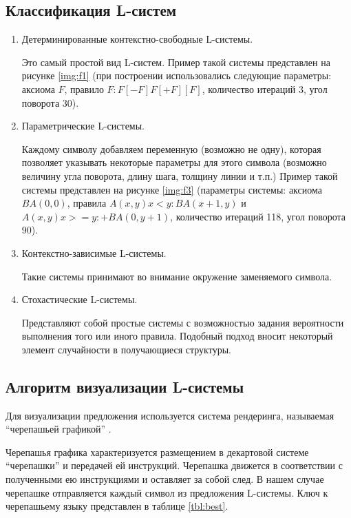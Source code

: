 \subsection{Классификация L-систем}
\begin{enumerate}
    \item Детерминированные контекстно-свободные L-системы.

    Это самый простой вид L-систем. Пример такой системы представлен на рисунке \ref{img:f1} (при построении использовались следующие параметры: аксиома $F$, правило $F: F[-F]F[+F][F]$, количество итераций 3, угол поворота 30).

    \newpage

    \item Параметрические L-системы.

    Каждому символу добавляем переменную (возможно не одну), которая позволяет указывать некоторые параметры для этого символа (возможно величину угла поворота, длину шага, толщину линии и т.п.) Пример такой системы представлен на рисунке \ref{img:f3} (параметры системы: аксиома $BA(0, 0)$, правила $A(x, y) x < y: BA(x + 1, y)$ и $A(x, y) x >= y: +BA(0, y + 1)$, количество итераций 118, угол поворота 90).


    \item Контекстно-зависимые L-системы.

    Такие системы принимают во внимание окружение заменяемого символа.

    \item Стохастические L-системы.

    Представляют собой простые системы с возможностью задания вероятности выполнения того или иного правила. Подобный подход вносит некоторый элемент случайности в получающиеся структуры.
\end{enumerate}


\subsection{Алгоритм визуализации L-системы}

Для визуализации предложения используется система рендеринга,
называемая “черепашьей графикой” \cite{hanan}.

Черепашья графика характеризуется размещением в декартовой системе
“черепашки” и передачей ей инструкций. Черепашка движется в соответствии с полученными ею инструкциями и оставляет за собой след. В нашем случае черепашке отправляется каждый символ из предложения L-системы. Ключ к черепашьему языку представлен в таблице \ref{tbl:best}.

